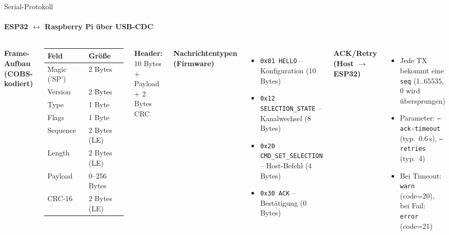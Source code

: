 \begin{frame}{Serial-Protokoll}
\framesubtitle{ESP32 $\leftrightarrow$ Raspberry Pi \"{u}ber USB-CDC}

\begin{columns}[T,onlytextwidth]
\textbf{Frame-Aufbau (COBS-kodiert)}
\begin{table}
\small
\begin{tabular}{@{}ll@{}}
\toprule
\textbf{Feld} & \textbf{Gr\"{o}\ss e} \\
\midrule
Magic ('SP') & 2 Bytes \\
Version & 2 Bytes \\
Type & 1 Byte \\
Flags & 1 Byte \\
Sequence & 2 Bytes (LE) \\
Length & 2 Bytes (LE) \\
Payload & 0--256 Bytes \\
CRC-16 & 2 Bytes (LE) \\
\bottomrule
\end{tabular}
\end{table}

\vspace{0.2cm}
\textbf{Header:} 10 Bytes + Payload + 2 Bytes CRC

\textbf{Nachrichtentypen (Firmware)}
\begin{itemize}\setlength{\itemsep}{1pt}
  \item \texttt{0x01 HELLO} -- Konfiguration (10 Bytes)
  \item \texttt{0x12 SELECTION\_STATE} -- Kanalwechsel (8 Bytes)
  \item \texttt{0x20 CMD\_SET\_SELECTION} -- Host-Befehl (4 Bytes)
  \item \texttt{0x30 ACK} -- Best\"{a}tigung (0 Bytes)
\end{itemize}

\vspace{0.2cm}
\textbf{ACK/Retry (Host $\rightarrow$ ESP32)}
\begin{itemize}
  \item Jede TX bekommt eine \texttt{seq} (1..65535, 0 wird \"{u}bersprungen)
  \item Parameter: \texttt{--ack-timeout} (typ.\ $0.6\,\mathrm{s}$), \texttt{--retries} (typ.\ 4)
  \item Bei Timeout: \texttt{warn} (code=20), bei Fail: \texttt{error} (code=21)
\end{itemize}
\end{columns}
\end{frame}

